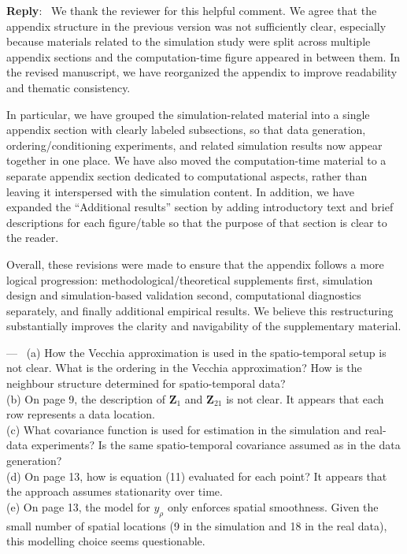 \documentclass[12pt]{article}
\newcommand{\0}{\mathbf{0}}
\newcounter{reviewer}
\newcounter{point}[reviewer]
\renewcommand{\thepoint}{P\,\thereviewer.\arabic{point}}
\newenvironment{point}
   {\refstepcounter{point} \bigskip \noindent {\textbf{Point~\thepoint} } ---\ }
   {\par }
\newenvironment{reply}
   {\medskip \noindent \begin{sf}\color{Blue}\textbf{Reply}:\  }
   {\medskip \end{sf}}
\begin{document}
\begin{reply}
  We thank the reviewer for this helpful comment. We agree that the appendix structure in the previous version was not sufficiently clear, especially because materials related to the simulation study were split across multiple appendix sections and the computation-time figure appeared in between them. In the revised manuscript, we have reorganized the appendix to improve readability and thematic consistency.

In particular, we have grouped the simulation-related material into a single appendix section with clearly labeled subsections, so that data generation, ordering/conditioning experiments, and related simulation results now appear together in one place. We have also moved the computation-time material to a separate appendix section dedicated to computational aspects, rather than leaving it interspersed with the simulation content. In addition, we have expanded the “Additional results” section by adding introductory text and brief descriptions for each figure/table so that the purpose of that section is clear to the reader.

Overall, these revisions were made to ensure that the appendix follows a more logical progression: methodological/theoretical supplements first, simulation design and simulation-based validation second, computational diagnostics separately, and finally additional empirical results. We believe this restructuring substantially improves the clarity and navigability of the supplementary material.
\end{reply}

\begin{point}
 (a) How the Vecchia approximation is used in the spatio-temporal setup is not clear. 
What is the ordering in the Vecchia approximation? How is the neighbour structure 
determined for spatio-temporal data? \\
(b) On page 9, the description of $\mathbf{Z}_1$ and $\mathbf{Z}_{21}$ is not clear. 
It appears that each row represents a data location. \\
(c) What covariance function is used for estimation in the simulation and real-data 
experiments? Is the same spatio-temporal covariance assumed as in the data generation? \\
(d) On page 13, how is equation (11) evaluated for each point? It appears that the 
approach assumes stationarity over time. \\
(e) On page 13, the model for $y_\rho$ only enforces spatial smoothness. Given the small 
number of spatial locations (9 in the simulation and 18 in the real data), this modelling 
choice seems questionable.

\end{point}
\end{document}
